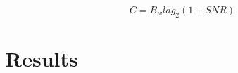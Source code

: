 \documentclass[twocolumn]{article}
\begin{document}
\begin{equation}
\label{shannon}
C=B_wlag_2(1+SNR)
\end{equation}

\section{Results}

\begin{figure}[H]
\centering
{}
\caption{}
\label{}
\end{figure}
\end{document}
